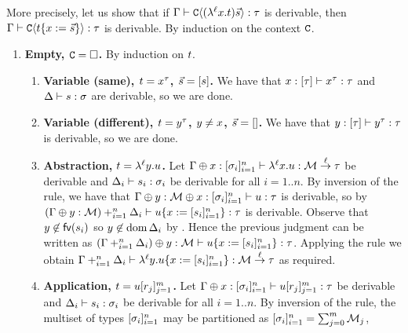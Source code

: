   More precisely, let us show that
  if $\Gamma \vdash \mathtt{C}\langle(\lambda^{\ell} x. t)\vec{s}\rangle : \tau$ is derivable,
  then $\Gamma \vdash \mathtt{C}\langle t\{x := \vec{s}\}\rangle : \tau$ is derivable.
  By induction on the context $\mathtt{C}$.
  \begin{enumerate}
  \item {\bf Empty, $\mathtt{C} = \Box$.}
    \label{subject_reduction__case_base_empty_context}
    By induction on $t$.
    \begin{enumerate}
    \item {\bf Variable (same), $t = x^\tau$, $\vec{s} = [s]$.}
      We have that $x : [\tau] \vdash x^\tau : \tau$
      and $\Delta \vdash s : \sigma$ are derivable,
      so we are done.
    \item {\bf Variable (different), $t = y^\tau$, $y \neq x$, $\vec{s} = []$.}
      We have that $y : [\tau] \vdash y^\tau : \tau$ is derivable, so we are done.
    \item {\bf Abstraction, $t = \lambda^{\ell} y. u$.}
      Let $\Gamma \oplus x : [\sigma_i]_{i=1}^n \vdash \lambda^{\ell} x. u : \mathcal{M} \overset{\ell}{\to} \tau$
      be derivable
      and $\Delta_i \vdash s_i : \sigma_i$ be derivable for all $i=1..n$.
      By inversion of the \indrulename{\toI} rule,
      we have that $\Gamma \oplus y : \mathcal{M} \oplus x : [\sigma_i]_{i=1}^n \vdash u : \tau$
      is derivable, so by \ih
      $(\Gamma \oplus y : \mathcal{M}) +_{i=1}^{n} \Delta_i \vdash u\{x := [s_i]_{i=1}^n\} : \tau$ is derivable.
      Observe that $y \not\in \mathsf{fv}({s_i})$ so $y \not\in \operatorname{dom}\Delta_i$ by .
      Hence the previous judgment can be written as
      $(\Gamma +_{i=1}^{n} \Delta_i) \oplus y : \mathcal{M} \vdash u\{x := [s_i]_{i=1}^n\} : \tau$.
      Applying the \indrulename{\toI} rule we obtain
      $\Gamma +_{i=1}^{n} \Delta_i \vdash \lambda^{\ell} y. u\{x := [s_i]_{i=1}^n\} : \mathcal{M} \overset{\ell}{\to} \tau$
      as required.
    \item {\bf Application, $t = u[r_j]_{j=1}^m$.}
      Let $\Gamma \oplus x : [\sigma_i]_{i=1}^n \vdash u[r_j]_{j=1}^m : \tau$
      be derivable
      and $\Delta_i \vdash s_i : \sigma_i$ be derivable for all $i=1..n$.
      By inversion of the \indrulename{\toE} rule,
      the multiset of types $[\sigma_i]_{i=1}^n$
      may be partitioned as $[\sigma_i]_{i=1}^n = \sum_{j=0}^{m} \mathcal{M}_j$,

\end{enumerate}
\end{enumerate}
